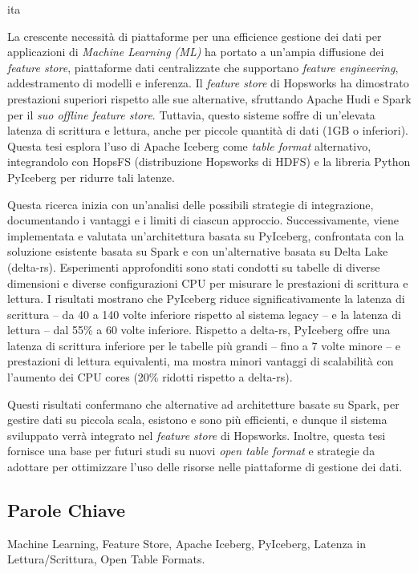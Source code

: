 \markboth{\abstractname}{}
\begin{scontents}[store-env=lang]
ita
\end{scontents}



\begin{scontents}[store-env=abstracts,print-env=true]
La crescente necessità di piattaforme per una efficience gestione dei dati per applicazioni di \textit{Machine Learning (ML)} ha portato a un'ampia diffusione dei \textit{feature store}, piattaforme dati centralizzate che supportano \textit{feature engineering}, addestramento di modelli e inferenza. Il \textit{feature store} di Hopsworks ha dimostrato prestazioni superiori rispetto alle sue alternative, sfruttando Apache Hudi e Spark per il \textit{suo offline feature store}. Tuttavia, questo sisteme soffre di un'elevata latenza di scrittura e lettura, anche per piccole quantità di dati (1GB o inferiori). Questa tesi esplora l'uso di Apache Iceberg come \textit{table format} alternativo, integrandolo con HopsFS (distribuzione Hopsworks di HDFS) e la libreria Python PyIceberg per ridurre tali latenze.

Questa ricerca inizia con un'analisi delle possibili strategie di integrazione, documentando i vantaggi e i limiti di ciascun approccio. Successivamente, viene implementata e valutata un'architettura basata su PyIceberg, confrontata con la soluzione esistente basata su Spark e con un'alternative basata su Delta Lake (delta-rs). Esperimenti approfonditi sono stati condotti su tabelle di diverse dimensioni e diverse configurazioni CPU per misurare le prestazioni di scrittura e lettura. I risultati mostrano che PyIceberg riduce significativamente la latenza di scrittura -- da 40 a 140 volte inferiore rispetto al sistema legacy -- e la latenza di lettura -- dal 55\% a 60 volte inferiore. Rispetto a delta-rs, PyIceberg offre una latenza di scrittura inferiore per le tabelle più grandi -- fino a 7 volte minore -- e prestazioni di lettura equivalenti, ma mostra minori vantaggi di scalabilità con l'aumento dei CPU cores (20\% ridotti rispetto a delta-rs).

Questi risultati confermano che alternative ad architetture basate su Spark, per gestire dati su piccola scala, esistono e sono più efficienti, e dunque il sistema sviluppato verrà integrato nel \textit{feature store} di Hopsworks. Inoltre, questa tesi fornisce una base per futuri studi su nuovi \textit{open table format} e strategie da adottare per ottimizzare l'uso delle risorse nelle piattaforme di gestione dei dati.
\end{scontents}



\subsection*{Parole Chiave}
\begin{scontents}[store-env=keywords,print-env=true]
Machine Learning, Feature Store, Apache Iceberg, PyIceberg, Latenza in Lettura/Scrittura, Open Table Formats.
\end{scontents}